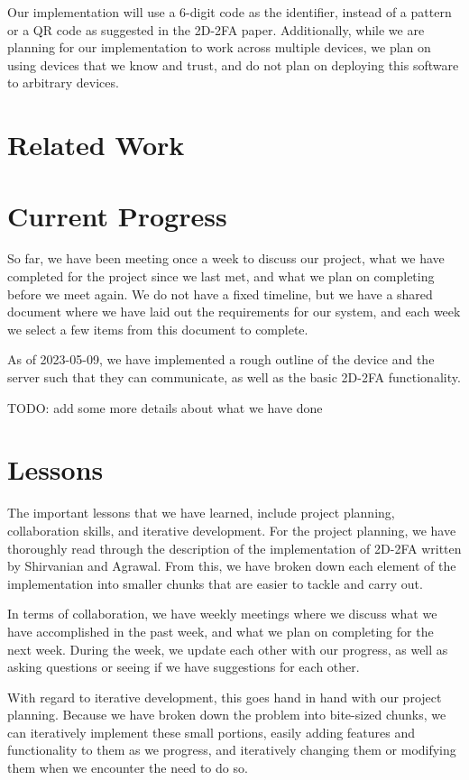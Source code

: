 \documentclass{article} %
\begin{document}
Our implementation will use a 6-digit code as the identifier, instead of
a pattern or a QR code as suggested in the 2D-2FA paper. Additionally,
while we are planning for our implementation to work across multiple
devices, we plan on using devices that we know and trust, and do not
plan on deploying this software to arbitrary devices.

\section{Related Work}

\section{Current Progress}

So far, we have been meeting once a week to discuss our project, what we
have completed for the project since we last met, and what we plan on
completing before we meet again. We do not have a fixed timeline, but we
have a shared document where we have laid out the requirements for our
system, and each week we select a few items from this document to
complete. 

As of 2023-05-09, we have implemented a rough outline of the device and
the server such that they can communicate, as well as the basic 2D-2FA
functionality. 

TODO: add some more details about what we have done

\section{Lessons}

The important lessons that we have learned, include project planning,
collaboration skills, and iterative development. For the project
planning, we have thoroughly read through the description of the
implementation of 2D-2FA written by Shirvanian and Agrawal. From this,
we have broken down each element of the implementation into smaller
chunks that are easier to tackle and carry out.

In terms of collaboration, we have weekly meetings where we discuss what
we have accomplished in the past week, and what we plan on completing
for the next week. During the week, we update each other with our
progress, as well as asking questions or seeing if we have suggestions
for each other. 

With regard to iterative development, this goes hand in hand with our
project planning. Because we have broken down the problem into
bite-sized chunks, we can iteratively implement these small portions,
easily adding features and functionality to them as we progress, and
iteratively changing them or modifying them when we encounter the need
to do so.
\end{document}
